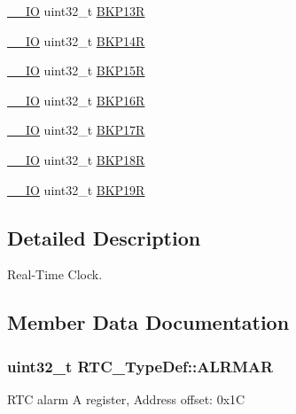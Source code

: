 \begin{DoxyCompactItemize}
\item 
\hyperlink{core__cm4_8h_aec43007d9998a0a0e01faede4133d6be}{\+\_\+\+\_\+\+IO} uint32\+\_\+t \hyperlink{struct_r_t_c___type_def_a138903d4681455a660dccbaf3409263d}{B\+K\+P13R}
\item 
\hyperlink{core__cm4_8h_aec43007d9998a0a0e01faede4133d6be}{\+\_\+\+\_\+\+IO} uint32\+\_\+t \hyperlink{struct_r_t_c___type_def_adaae50f5c3213014fb9818eaee389676}{B\+K\+P14R}
\item 
\hyperlink{core__cm4_8h_aec43007d9998a0a0e01faede4133d6be}{\+\_\+\+\_\+\+IO} uint32\+\_\+t \hyperlink{struct_r_t_c___type_def_a797f43f9cc1858baebd1799be288dff6}{B\+K\+P15R}
\item 
\hyperlink{core__cm4_8h_aec43007d9998a0a0e01faede4133d6be}{\+\_\+\+\_\+\+IO} uint32\+\_\+t \hyperlink{struct_r_t_c___type_def_a181ad73082bde7d74010aac16bd373fc}{B\+K\+P16R}
\item 
\hyperlink{core__cm4_8h_aec43007d9998a0a0e01faede4133d6be}{\+\_\+\+\_\+\+IO} uint32\+\_\+t \hyperlink{struct_r_t_c___type_def_a90a305a8e00b357f28daef5041e5a8b1}{B\+K\+P17R}
\item 
\hyperlink{core__cm4_8h_aec43007d9998a0a0e01faede4133d6be}{\+\_\+\+\_\+\+IO} uint32\+\_\+t \hyperlink{struct_r_t_c___type_def_a171288f82cab2623832de779fb435d74}{B\+K\+P18R}
\item 
\hyperlink{core__cm4_8h_aec43007d9998a0a0e01faede4133d6be}{\+\_\+\+\_\+\+IO} uint32\+\_\+t \hyperlink{struct_r_t_c___type_def_a993f54e8feff9254f795dfd3e000fc55}{B\+K\+P19R}
\end{DoxyCompactItemize}


\subsection{Detailed Description}
Real-\/\+Time Clock. 

\subsection{Member Data Documentation}
\subsubsection[{\texorpdfstring{A\+L\+R\+M\+AR}{ALRMAR}}]{ uint32\+\_\+t R\+T\+C\+\_\+\+Type\+Def\+::\+A\+L\+R\+M\+AR}\hypertarget{struct_r_t_c___type_def_ad7e54d5c5a4b9fd1e26aca85b1e36c7f}{}\label{struct_r_t_c___type_def_ad7e54d5c5a4b9fd1e26aca85b1e36c7f}
R\+TC alarm A register, Address offset\+: 0x1C 
